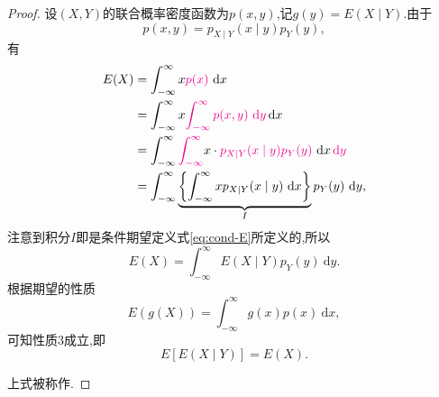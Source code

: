 \documentclass[cn,10pt,citestyle=gb7714-2015,bibstyle=gb7714-2015]{elegantbook}
\newcommand{\md}{\ \mathrm{d}}
\begin{document}
\begin{proof}
  设$(X,Y)$的联合概率密度函数为$p(x,y)$,记$g(y)=E(X\mid Y)$.由于
  \[
      p(x,y)=p_{X\mid Y}(x\mid y)p_Y(y),
  \]
  有
  \begin{align*}
    E(X)&=\int_{-\infty}^\infty x\textcolor{magenta}{p(x)}\md x\\
    &=\int_{-\infty}^\infty x\textcolor{magenta}{\int_{-\infty}^\infty p(x,y)\md y}\!\md x\\
    &=\int_{-\infty}^\infty\textcolor{magenta}{\int_{-\infty}^\infty} x\cdot\textcolor{magenta}{p_{X\mid Y}(x\mid y)p_Y(y)}\md x\!\textcolor{magenta}{\md y}\\
    &=\int_{-\infty}^\infty\underbrace{\left\{\int_{-\infty}^\infty xp_{X\mid Y}(x\mid y)\md x\right\}}_{I}p_Y(y)\md y,
  \end{align*}
  注意到积分$I$即是条件期望定义式\eqref{eq:cond-E}所定义的,所以
  \[
      E(X)=\int_{-\infty}^\infty E(X\mid Y)p_Y(y)\md y.
  \]
  根据期望的性质
  \[
      E\left(g(X)\right)=\int_{-\infty}^\infty g(x)p(x)\md x,
  \]
  可知性质3成立,即
  \begin{equation}\label{eq:mult-E}
    E\left[E(X\mid Y)\right]=E(X).
  \end{equation}
    
  上式被称作.
\end{proof}
\end{document}
